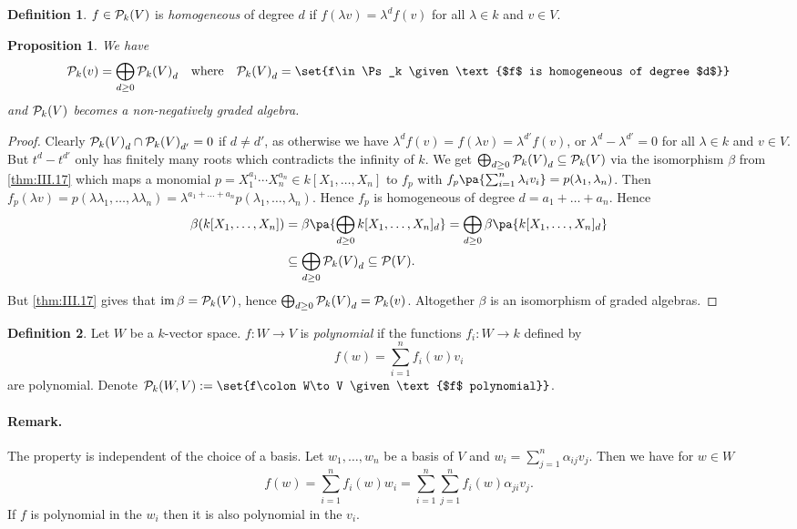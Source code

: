 \documentclass[12pt,a4paper]{scrartcl}
\theoremstyle{cplain}
\theoremstyle{cplain}
\theoremstyle{cplain}
\newtheorem{prop}[thmcounter]{Proposition}
\theoremstyle{definition}
\newtheorem*{deff}{Definition}
\begin{document}
\begin{otherlanguage}{english}
\begin{deff}
  $f\in \mathcal{P}_k(V)$ is \emph{homogeneous} of degree $d$ if $f(\lambda v) = \lambda^df(v)$ for all $\lambda \in k$ and $v\in V$.
\end{deff}

\begin{prop} \label{prop:III.19}
  We have \[ \Ps_k(v) = \bigoplus_{d\ge0}{\Ps_k(V)}_d \quad\text{where}\quad {\Ps_k(V)}_d = \set{f\in \Ps_k \given \text{$f$ is homogeneous of degree $d$}} \] and $\mathcal{P}_k(V)$ becomes a non-negatively graded algebra.
\end{prop}
\begin{proof}
  Clearly ${\mathcal{P}_k(V)}_d \cap {\mathcal{P}_k(V)}_{d'} = 0$ if $d \neq d'$, as otherwise we have $\lambda^df(v) = f(\lambda v) = \lambda^{d'}f(v)$, or $\lambda^d - \lambda^{d'}=0$ for all $\lambda \in k$ and $v \in V$. But $t^d -t^{d'}$ only has finitely many roots which contradicts the infinity of $k$. We get $\bigoplus_{d\ge0}{\mathcal{P}_k(V)}_d \subseteq \mathcal{P}_k(V)$ via the isomorphism $\beta $ from \cref{thm:III.17} which maps a monomial $p = X_1^{a_1}\cdots X_n^{a_n} \in k[X_1,\ldots,X_n]$ to $f_p$ with $f_p\pa{\sum_{i=1}^n\lambda_iv_i} = p(\lambda_1,\lambda_n)$. Then $f_p(\lambda v) = p(\lambda\lambda_1,\ldots,\lambda\lambda_n) = \lambda^{a_1+\ldots+a_n}p(\lambda_1,\ldots,\lambda_n)$. Hence $f_p$ is homogeneous of degree $d = a_1+\dots+a_n$. Hence \begin{align*} \beta(k[X_1,\ldots,X_n]) &= \beta\pa{\bigoplus_{d\ge 0} k[X_1,\ldots,X_n]_d} = \bigoplus_{d\ge 0}\beta\pa{k[X_1,\ldots,X_n]_d} \\ &\subseteq \bigoplus_{d\ge0}{\Ps_k(V)}_d \subseteq \Ps(V). \end{align*} But \cref{thm:III.17} gives that $\operatorname{im} \beta = \mathcal{P}_k(V)$, hence $\bigoplus_{d\ge0}{\mathcal{P}_k(V)}_d = \mathcal{P}_k(v)$. Altogether $\beta$ is an isomorphism of graded algebras.
\end{proof}

\begin{deff}
  Let $W$ be a $k$-vector space. $f\colon W\to V$ is \emph{polynomial} if the functions $f_i\colon W \to k$ defined by \[f(w) = \sum_{i=1}^nf_i(w)v_i \] are polynomial. Denote $\Ps_k(W,V) := \set{f\colon W\to V \given\text{$f$ polynomial}}$.
\end{deff}

\paragraph{Remark.}
The property is independent of the choice of a basis. Let $w_1,\ldots,w_n$ be a basis of $V$ and $w_i = \sum_{j=1}^n\alpha_{ij}v_j$. Then we have for $w \in W$ \[ f(w) = \sum_{i=1}^n f_i(w) w_i = \sum_{i=1}^n\sum_{j=1}^n f_i(w)\alpha_{ji}v_j. \]
If $f$ is polynomial in the $w_i$ then it is also polynomial in the $v_i$.


\end{otherlanguage}
\end{document}
